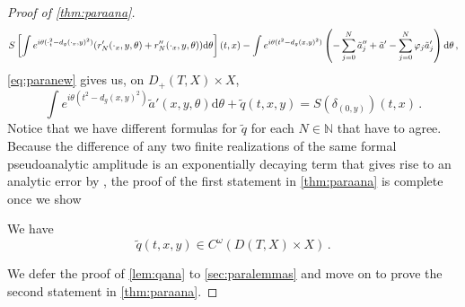 \documentclass[
	fontsize=11pt, 
	twoside=false, 
	abstract=true, 
	a4paper,
]{scrartcl}
\newcommand{\RR}{\mathbb{R}}
\newcommand{\DD}{\mathscr{D}}
\newcommand{\dd}{\mathrm{d}}
\newcommand{\abs}[1]{\left\lvert#1\right\rvert}
\newcommand{\del}{\partial}
\newcommand{\td}[1]{\tilde{#1}}
\begin{document}
\begin{proof}[Proof of \cref{thm:paraana}]
\begin{gather}
			S\left[\int e^{i\theta(\cdot_t^2-d_g(\cdot_x,y)^2)}(r_N'(\cdot_x,y,\theta)+ r_N''(\cdot_x,y,\theta)) \dd\theta\right](t,x) %
			- \int e^{i\theta(t^2-d_g(x,y)^2)}\left(-\sum_{j=0}^N\td{a}_j'' +\td{a}' - \sum_{j=0}^N \varphi_j\td{a}_j'\right)\dd\theta\,,\notag
	\end{gather}
	\cref{eq:paranew} gives us, on $D_+(T,X)\times X$,
	\begin{equation*}%
		\int e^{i\theta(t^2-d_g(x,y)^2)}\td{a}'(x,y,\theta)\dd\theta + \td{q}(t,x,y) = S(\delta_{(0,y)})(t,x)\,.
	\end{equation*}
	Notice that we have different formulas for $\td{q}$ for each $N\in\mathbb{N}$ that have to agree. Because the difference of any two finite realizations of the same formal pseudoanalytic amplitude is an exponentially decaying term that gives rise to an analytic error by \cite[Prop.~17.1.19]{MR4436039}, the proof of the first statement in \cref{thm:paraana} is complete once we show
	\begin{lemma}\label{lem:qana}
		We have 
	\begin{equation*}%
		\td{q}(t,x,y) \in %
		C^\omega(D(T,X)\times X)\,.
	\end{equation*}
	\end{lemma}
	We defer the proof of \cref{lem:qana} to \cref{sec:paralemmas} and move on to prove the second statement in \cref{thm:paraana}. 


\end{proof}
\end{document}
